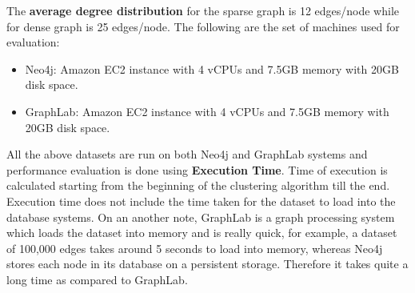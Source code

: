 The \textbf{average degree distribution} for the sparse graph is 12 edges/node while for dense graph is 25 edges/node.
The following are the set of machines used for evaluation: 
\begin{itemize}
	\item
	Neo4j: Amazon EC2 instance with 4 vCPUs and 7.5GB memory with 20GB disk space.
	\item
	GraphLab: Amazon EC2 instance with 4 vCPUs and 7.5GB memory with 20GB disk space.
\end{itemize}
All the above datasets are run on both Neo4j and GraphLab systems and performance evaluation is done using \textbf{Execution Time}. Time of execution is calculated starting from the beginning of the clustering algorithm till the end. \\
Execution time does not include the time taken for the dataset to load into the database systems. On an another note, GraphLab is a graph processing system which loads the dataset into memory and is really quick, for example, a dataset of 100,000 edges takes around 5 seconds to load into memory, whereas Neo4j stores each node in its database on a persistent storage. Therefore it takes quite a long time as compared to GraphLab.